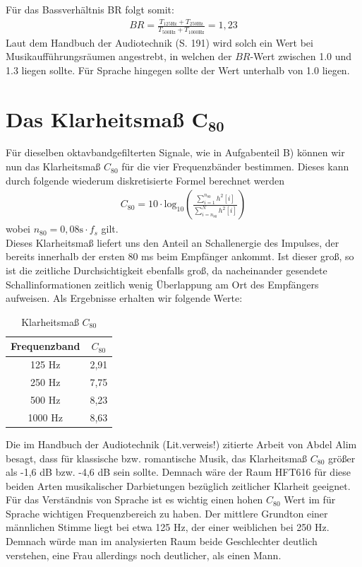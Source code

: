 Für das Bassverhältnis BR folgt somit:
\begin{align*}
BR = \frac{T_{125 \mathrm{Hz}} + T_{250 \mathrm{Hz}}}{T_{500 \mathrm{Hz}} + T_{1000 \mathrm{Hz}}} = 1,23
\end{align*}  
Laut dem Handbuch der Audiotechnik \cite{Weinzierl08} (S. 191) wird solch ein Wert bei Musikaufführungsräumen angestrebt, in welchen der $BR$-Wert zwischen 1.0 und 1.3 liegen sollte.
Für Sprache hingegen sollte der Wert unterhalb von 1.0 liegen.

\section{Das Klarheitsmaß $\mathbf{C_{80}}$}
\label{sec:c80}
Für dieselben oktavbandgefilterten Signale, wie in Aufgabenteil B) können wir nun das Klarheitsmaß $C_{80}$ für die vier Frequenzbänder bestimmen.
Dieses kann durch folgende wiederum diskretisierte Formel berechnet werden
\begin{align*}
C_{80} = 10\cdot \mathrm{log}_{10}\left(\frac{ \sum_{i=1}^{n_{80}} h^2[i]}{\sum_{i=n_{80}}^N h^2[i]}\right)
\end{align*}
wobei $n_{80} = 0,08 \mathrm{s} \cdot f_s$ gilt. \\
Dieses Klarheitsmaß liefert uns den Anteil an Schallenergie des Impulses, der bereits innerhalb der ersten 80 ms beim Empfänger ankommt.
Ist dieser groß, so ist die zeitliche Durchsichtigkeit ebenfalls groß, da nacheinander gesendete Schallinformationen zeitlich wenig Überlappung am Ort des Empfängers aufweisen.
Als Ergebnisse erhalten wir folgende Werte:
\begin{table}[H]
\centering
\caption{Klarheitsmaß $C_{80}$}
\label{tab:C80}
\begin{tabular}{| c | c |}
\hline
  Frequenzband & $C_{80}$ \\
  \hline
  125 Hz & 2,91 \\
  250 Hz & 7,75 \\
  500 Hz & 8,23 \\
  1000 Hz & 8,63  \\
  \hline
  \end{tabular}
\end{table}

Die im Handbuch der Audiotechnik (Lit.verweis!) zitierte Arbeit von Abdel Alim besagt, dass für klassische bzw. romantische Musik, das Klarheitsmaß $C_{80}$ größer als -1,6 dB bzw. -4,6 dB sein sollte.
Demnach wäre der Raum HFT616 für diese beiden Arten musikalischer Darbietungen bezüglich zeitlicher Klarheit geeignet.\\
Für das Verständnis von Sprache ist es wichtig einen hohen $C_{80}$ Wert im für Sprache wichtigen Frequenzbereich zu haben.
Der mittlere Grundton einer männlichen Stimme liegt bei etwa 125 Hz, der einer weiblichen bei 250 Hz.
Demnach würde man im analysierten Raum beide Geschlechter deutlich verstehen, eine Frau allerdings noch deutlicher, als einen Mann.


